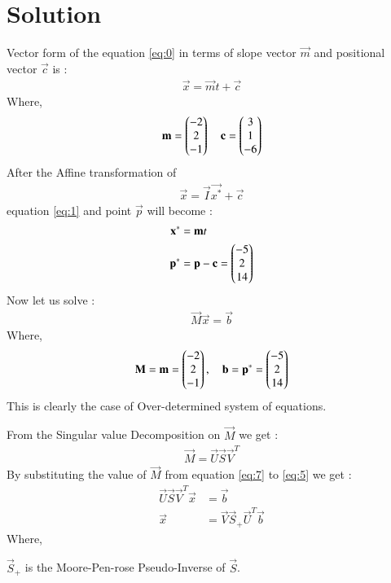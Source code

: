 \documentclass[journal,12pt,twocolumn]{IEEEtran}
\begin{document}
\section{\textbf{Solution}}
Vector form of the equation \eqref{eq:0} in terms of slope vector $\vec{m}$ and positional vector $\vec{c}$ is :
\begin{align}
\vec{x}=\vec{m}t+\vec{c}\label{eq:1}
\end{align}
Where,
\begin{align}
    \mathbf{m}=\begin{pmatrix}-2\\2\\-1\end{pmatrix}\quad\mathbf{c}=\begin{pmatrix}3\\1\\-6\end{pmatrix}
\end{align}
After the Affine transformation of
\begin{align}
    \vec{x}=\vec{I}\vec{x^*}+\vec{c}\label{eq:3}
\end{align}
equation \eqref{eq:1} and point $\vec{p}$ will become :
\begin{align}
    \mathbf{x^*}&=\mathbf{m}t\label{eq:4}\\
    \mathbf{p}^*&=\mathbf{p}-\mathbf{c}=\begin{pmatrix}-5\\2\\14\end{pmatrix}
\end{align}
Now let us solve :
\begin{align}
    \vec{M}\vec{x}=\vec{b}\label{eq:5}
\end{align}
Where,
\begin{align}
    \mathbf{M}=\mathbf{m}=\begin{pmatrix}-2\\2\\-1\end{pmatrix},\quad\mathbf{b}=\mathbf{p^*}=\begin{pmatrix}-5\\2\\14\end{pmatrix}
\end{align}
This is clearly the case of Over-determined system of equations.

From the Singular value Decomposition on $\vec{M}$ we get :
\begin{align}
\vec{M} = \vec{U}\vec{S}\vec{V}^T\label{eq:7}
\end{align}
By substituting the value of $\vec{M}$ from equation \eqref{eq:7} to \eqref{eq:5} we get :
\begin{align}
\vec{U}\vec{S}\vec{V}^T\vec{x} &= \vec{b}\\
\vec{x} &= \vec{V}\vec{S}_+\vec{U}^T\vec{b} \label{eq:10}
\end{align}
Where,


$\vec{S}_+$ is the Moore-Pen-rose Pseudo-Inverse of $\vec{S}$.
\end{document}
